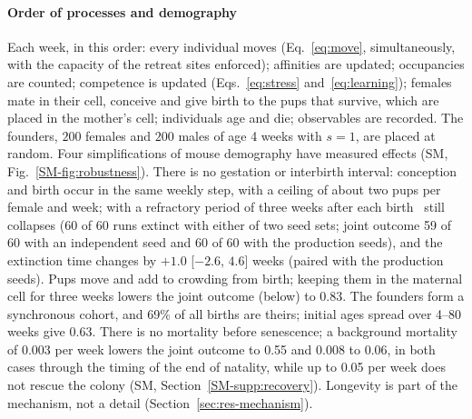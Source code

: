 \paragraph{Order of processes and demography}
Each week, in this order: every individual moves (Eq.~\ref{eq:move}, simultaneously, with the capacity of the
retreat sites enforced); affinities are updated; occupancies are counted; competence is updated
(Eqs.~\ref{eq:stress} and~\ref{eq:learning}); females mate in their cell, conceive and give birth to the pups that
survive, which are placed in the mother's cell; individuals age and die; observables are recorded. The founders,
$200$ females and $200$ males of age 4 weeks with $s=1$, are placed at random. Four simplifications of mouse
demography have measured effects (SM, Fig.~\ref{SM-fig:robustness}). There is no gestation or interbirth interval:
conception and birth occur in the same weekly step, with a ceiling of about two pups per female and week; with a
refractory period of three weeks after each birth \Cone\ still collapses (60 of 60 runs extinct with either of two seed
sets; joint outcome 59 of 60 with an independent seed and 60 of 60 with the production seeds), and the extinction
time changes by $+1.0$ [$-2.6$, $4.6$] weeks (paired with the production seeds). Pups move
and add to crowding from birth; keeping them in the maternal cell for three weeks lowers the joint outcome (below) to
0.83. The founders form a synchronous cohort, and 69\% of all births are theirs; initial ages spread over 4--80 weeks
give 0.63. There is no mortality before senescence; a background mortality of 0.003 per week lowers the joint
outcome to 0.55 and 0.008 to 0.06, in both cases through the timing of the end of natality, while up to 0.05 per
week does not rescue the colony (SM, Section~\ref{SM-supp:recovery}). Longevity is part of the mechanism, not a detail
(Section~\ref{sec:res-mechanism}).


